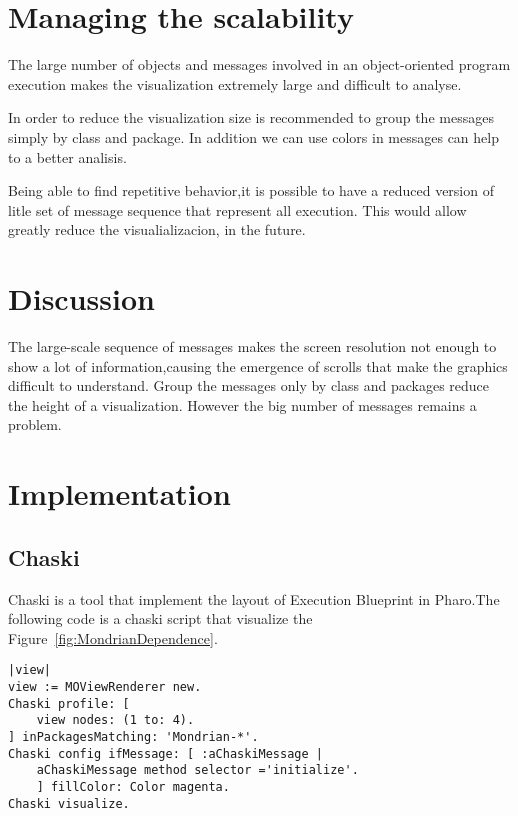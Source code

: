 \documentclass{sig-alternate}
\newcommand{\seclabel}[1]{\label{sec:#1}}
\newcommand{\figref}[1]{Figure~\ref{fig:#1}}
\begin{document}
\section{Managing the scalability}\seclabel{scalability}

The large number of objects and messages involved in an object-oriented program execution makes the visualization extremely large and difficult to analyse.

In order to reduce the visualization size is recommended to group the messages simply by class and package. In addition we can use colors in messages can help to a better analisis.

Being able to find repetitive behavior,it is possible to have a reduced version of litle set of message sequence that represent all execution. This would allow greatly reduce the visualializacion, in the future.

\section{Discussion}\seclabel{discussion}

The large-scale sequence of messages makes the screen resolution not enough to show a lot of information,causing the emergence of scrolls that make the graphics difficult to understand. Group the messages only by class and packages reduce the height of a visualization. However the big number of messages remains a problem.


\section{Implementation}\seclabel{implementation}

\subsection{Chaski}

Chaski is a tool that implement the layout of Execution Blueprint in Pharo.The following code is a chaski script that visualize the \figref{MondrianDependence}.
 
\begin{lstlisting}[language=Smalltalk]
|view|
view := MOViewRenderer new. 
Chaski profile: [ 	
	view nodes: (1 to: 4). 
] inPackagesMatching: 'Mondrian-*'.
Chaski config ifMessage: [ :aChaskiMessage | 
	aChaskiMessage method selector ='initialize'.
	] fillColor: Color magenta.
Chaski visualize.
\end{lstlisting}
\end{document}
